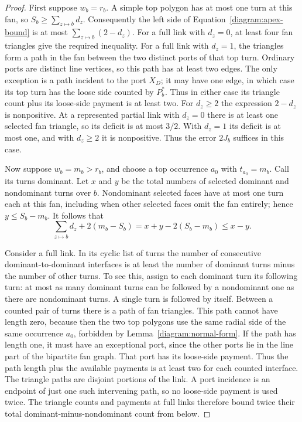 \begin{proof}
First suppose $w_b=r_b$.  A simple top polygon has at most one turn at
this fan, so $S_b\ge\sum_{z\mapsto b}d_z$.  Consequently the left side
of Equation~\eqref{diagram:apex-bound} is at most
$\sum_{z\mapsto b}(2-d_z)$.
For a full link with $d_z=0$, at least four fan triangles give the
required inequality.  For a full link with $d_z=1$, the triangles form
a path in the fan between the two distinct ports of that top turn.
Ordinary ports are distinct line vertices, so this path has at least
two edges.  The only exception is a path incident to the port $X_D$;
it may have one edge, in which case its top turn has the loose side
counted by $P_b^*$.  Thus in either case its triangle count plus its
loose-side payment is at least two.  For $d_z\ge2$ the expression
$2-d_z$ is nonpositive.  At a represented partial link with $d_z=0$
there is at least one selected fan triangle, so its deficit is at most
$3/2$.  With $d_z=1$ its deficit is at most one, and with $d_z\ge2$
it is nonpositive.  Thus the error $2J_b$ suffices in this case.

Now suppose $w_b=m_b>r_b$, and choose a top occurrence $a_0$ with
$t_{a_0}=m_b$.  Call its turns dominant.  Let $x$ and $y$ be the total
numbers of selected dominant and nondominant turns over $b$.
Nondominant selected faces have at most one turn each at this fan,
including when other selected faces omit the fan entirely; hence
$y\le S_b-m_b$.  It follows that
\begin{equation}\label{diagram:dominant-algebra}
 \sum_{z\mapsto b}d_z+2(m_b-S_b)
       =x+y-2(S_b-m_b)\le x-y.
\end{equation}

Consider a full link.  In its cyclic list of turns the number of
consecutive dominant-to-dominant interfaces is at least the number of
dominant turns minus the number of other turns.  To see this, assign to
each dominant turn its following turn: at most as many dominant turns
can be followed by a nondominant one as there are nondominant turns.
A single turn is followed by itself.  Between a counted pair of turns
there is a path of fan triangles.  This path cannot have length zero,
because then the two top polygons use the same radial side of the
same occurrence $a_0$, forbidden by
Lemma~\ref{diagram:normal-form}.  If the path has length one, it must
have an exceptional port, since the other ports lie in the line part
of the bipartite fan graph.  That port has its loose-side payment.
Thus the path length plus the available payments is at least two for
each counted interface.  The triangle paths are disjoint portions of
the link.  A port incidence is an endpoint of just one such intervening
path, so no loose-side payment is used twice.  The triangle counts and
payments at full links therefore bound twice their total
dominant-minus-nondominant count from below.


\end{proof}
